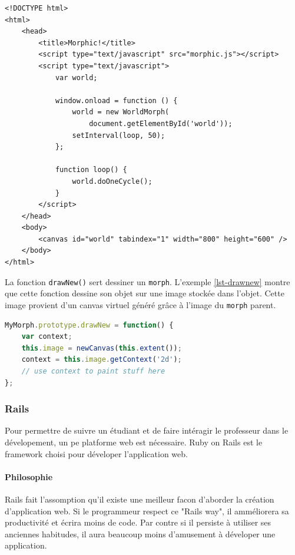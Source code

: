 \begin{lstlisting}[caption={Exemple d'utilisation de \texttt{morphic.js}},label=lst-doonecycle,language=HTML5,alsolanguage=JavaScript]
<!DOCTYPE html>
<html>
    <head>
        <title>Morphic!</title>
        <script type="text/javascript" src="morphic.js"></script>
        <script type="text/javascript">
            var world;

            window.onload = function () {
                world = new WorldMorph(
                    document.getElementById('world'));
                setInterval(loop, 50);
            };

            function loop() {
                world.doOneCycle();
            }
        </script>
    </head>
    <body>
        <canvas id="world" tabindex="1" width="800" height="600" />
    </body>
</html>
\end{lstlisting}

La fonction \texttt{drawNew()} sert dessiner un \texttt{morph}. L'exemple \ref{lst-drawnew} montre que cette fonction dessine son objet sur une image stockée dans l'objet. Cette image provient d'un canvas virtuel généré grâce à l'image du \texttt{morph} parent.

\begin{lstlisting}[caption={Modèle pour la fonction \texttt{drawNew()}},label=lst-drawnew,language=JavaScript]
MyMorph.prototype.drawNew = function() {
    var context;
    this.image = newCanvas(this.extent());
    context = this.image.getContext('2d');
    // use context to paint stuff here
};
\end{lstlisting}

\subsubsection{Rails}
Pour permettre de suivre un étudiant et de faire intéragir le professeur dans le dévelopement, un pe platforme web est nécessaire. Ruby on Rails est le framework choisi pour déveloper l'application web. 

\paragraph{Philosophie}
Rails fait l'assomption qu'il existe une meilleur facon d'aborder la création d'application web. Si le programmeur respect ce "Rails way", il amméliorera sa productivité et écrira moins de code. Par contre si il persiste à utiliser ses anciennes habitudes, il aura beaucoup moins d'amusement à déveloper une application.

